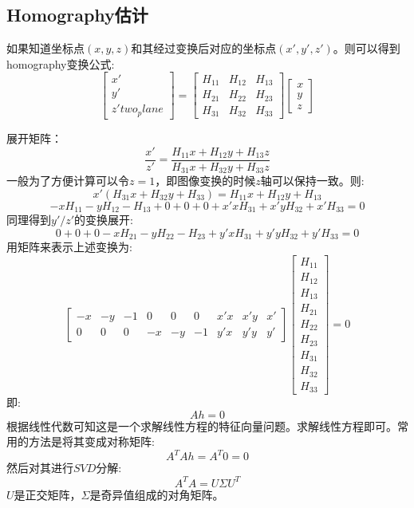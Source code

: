 \documentclass[12pt]{book}
\begin{document}
\subsection{Homography估计}
如果知道坐标点$(x, y, z)$和其经过变换后对应的坐标点$(x', y', z')$。则可以得到homography变换公式:
\begin{equation}\label{homography_two_plane}
\left[ {\begin{array}{*{20}{c}}
		{x'}\\
		{y'}\\
		{z'}two_plane
\end{array}} \right] = \left[ {\begin{array}{*{20}{c}}
		{{H_{11}}}&{{H_{12}}}&{{H_{13}}}\\
		{{H_{21}}}&{{H_{22}}}&{{H_{23}}}\\
		{{H_{31}}}&{{H_{32}}}&{{H_{33}}}
\end{array}} \right]\left[ {\begin{array}{*{20}{c}}
		x\\
		y\\
		z
\end{array}} \right]
\end{equation}

展开矩阵：
\[\frac{{x'}}{{z'}} = \frac{{{H_{11}}x + {H_{12}}y + {H_{13}}z}}{{{H_{31}}x + {H_{32}}y + {H_{33}}z}}\]
一般为了方便计算可以令$z=1$，即图像变换的时候$z$轴可以保持一致。则:
\[x'({H_{31}}x + {H_{32}}y + {H_{33}}) = {H_{11}}x + {H_{12}}y + {H_{13}}\]
\[ - x{H_{11}} - y{H_{12}} - {H_{13}} + 0 + 0 + 0 + x'x{H_{31}} + x'y{H_{32}} + x'{H_{33}} = 0\]
同理得到$y'/z'$的变换展开:
\[0 + 0 + 0 - x{H_{21}} - y{H_{22}} - {H_{23}} + y'x{H_{31}} + y'y{H_{32}} + y'{H_{33}} = 0\]
用矩阵来表示上述变换为:
\begin{equation}\label{homography_estimation}
[\begin{array}{*{20}{c}}
	{ - x}&{ - y}&{ - 1}&0&0&0&{x'x}&{x'y}&{x'}\\
	0&0&0&{ - x}&{ - y}&{ - 1}&{y'x}&{y'y}&{y'}
\end{array}]\left[ {\begin{array}{*{20}{c}}
		{{H_{11}}}\\
		{{H_{12}}}\\
		{{H_{13}}}\\
		{{H_{21}}}\\
		{{H_{22}}}\\
		{{H_{23}}}\\
		{{H_{31}}}\\
		{{H_{32}}}\\
		{{H_{33}}}
\end{array}} \right] = 0
\end{equation}
即:
\[Ah = 0\]
根据线性代数\cite{strang1993introduction}可知这是一个求解线性方程的特征向量问题。求解线性方程即可。常用的方法是将其变成对称矩阵:
\[{A^T}Ah = {A^T}0 = 0\]
然后对其进行$SVD$分解:
\[{A^T}A = U\Sigma {U^T}\]
$U$是正交矩阵，$\Sigma$是奇异值组成的对角矩阵。
\end{document}
